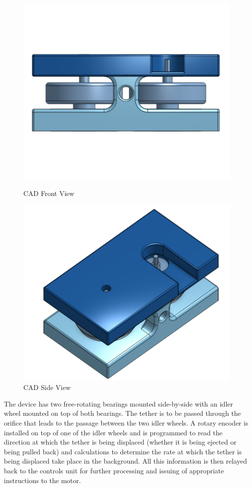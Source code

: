 \begin{figure}[H]
 \centering
\begin{minipage}{.5\textwidth}
  \centering
  \includegraphics[width=0.8\linewidth]{Controls/RPM_00.png}
  \caption{\label{fig:RPM_00}CAD Front View} 
\end{minipage}%
\begin{minipage}{.5\textwidth}
  \centering
  \includegraphics[width=0.8\linewidth]{Controls/RPM_01.png}
  \caption{\label{fig:RPM_01}CAD Side View}
\end{minipage}
\end{figure}

The device has two free-rotating bearings mounted side-by-side with an idler wheel mounted on top of both bearings. The tether is to be passed through the orifice that leads to the passage between the two idler wheels. A rotary encoder is installed on top of one of the idler wheels and is programmed to read the direction at which the tether is being displaced (whether it is being ejected or being pulled back) and calculations to determine the rate at which the tether is being displaced take place in the background. All this information is then relayed back to the controls unit for further processing and issuing of appropriate instructions to the motor.

